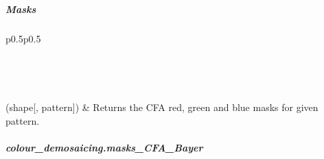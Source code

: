 \documentclass[letterpaper,10pt,english]{sphinxmanual}
\begin{document}
\subparagraph{Masks}
\label{\detokenize{colour_demosaicing.bayer:masks}}


\begin{savenotes}\sphinxatlongtablestart\begin{longtable}{p{0.5\linewidth}p{0.5\linewidth}}
\hline

\endfirsthead

%
{}\\
\hline

\endhead

\hline
{}\\
\endfoot

\endlastfoot

{\hyperref[\detokenize{generated/colour_demosaicing.masks_CFA_Bayer:colour_demosaicing.masks_CFA_Bayer}]{}}(shape{[}, pattern{]})
&
Returns the  CFA red, green and blue masks for given pattern.
\\
\hline
\end{longtable}\sphinxatlongtableend\end{savenotes}


\subparagraph{colour\_demosaicing.masks\_CFA\_Bayer}
\label{\detokenize{generated/colour_demosaicing.masks_CFA_Bayer:colour-demosaicing-masks-cfa-bayer}}\label{\detokenize{generated/colour_demosaicing.masks_CFA_Bayer::doc}}
\end{document}
